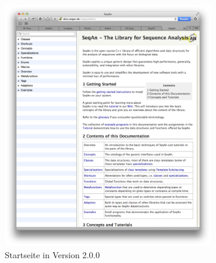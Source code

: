 \thispagestyle{empty}
\begin{figure}
        \centering
        \begin{subfigure}[b]{0.48\linewidth}
                \includegraphics[width=\linewidth]{Figures/dox/dox-2_0_0-small-home.png}
                \caption{Startseite in Version 2.0.0}
                \label{fig:dox-small-home-2.0.0}
        \end{subfigure}
        \hfill
        \begin{subfigure}[b]{0.48\linewidth}

\end{subfigure}
\end{figure}
